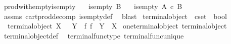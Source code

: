 \begin{isabellebody}
\endisadelimproof
\isanewline
{}\isamarkupfalse%
\ prod{\isacharunderscore}{\kern0pt}with{\isacharunderscore}{\kern0pt}empty{\isacharunderscore}{\kern0pt}is{\isacharunderscore}{\kern0pt}empty{}{\isacharcolon}{\kern0pt}\isanewline
\ \ \ {\isachardoublequoteopen}is{\isacharunderscore}{\kern0pt}empty\ {\isacharparenleft}{\kern0pt}B{\isacharparenright}{\kern0pt}{\isachardoublequoteclose}\isanewline
\ \ \ {\isachardoublequoteopen}is{\isacharunderscore}{\kern0pt}empty\ {\isacharparenleft}{\kern0pt}A\ {\isasymtimes}\isactrlsub c\ B{\isacharparenright}{\kern0pt}{\isachardoublequoteclose}\isanewline
%
\isadelimproof
\ \ %
\endisadelimproof
%
\isatagproof
{}\isamarkupfalse%
\ assms\ cart{\isacharunderscore}{\kern0pt}prod{\isacharunderscore}{\kern0pt}decomp\ is{\isacharunderscore}{\kern0pt}empty{\isacharunderscore}{\kern0pt}def\ \isamarkupfalse%
\ blast%
\endisatagproof
{\isafoldproof}%
%
\isadelimproof
%
\endisadelimproof
%
\isadelimdocument
%
\endisadelimdocument
%
\isatagdocument
%
\isamarkuptrue%
%
\endisatagdocument
{\isafolddocument}%
%
\isadelimdocument
%
\endisadelimdocument
{}\isamarkupfalse%
\ terminal{\isacharunderscore}{\kern0pt}object\ {\isacharcolon}{\kern0pt}{\isacharcolon}{\kern0pt}\ {\isachardoublequoteopen}cset\ {\isasymRightarrow}\ bool{\isachardoublequoteclose}\ \isanewline
\ \ {\isachardoublequoteopen}terminal{\isacharunderscore}{\kern0pt}object\ X\ {\isasymlongleftrightarrow}\ {\isacharparenleft}{\kern0pt}{\isasymforall}\ Y{\isachardot}{\kern0pt}\ {\isasymexists}{\isacharbang}{\kern0pt}\ f{\isachardot}{\kern0pt}\ f\ {\isacharcolon}{\kern0pt}\ Y\ {\isasymrightarrow}\ X{\isacharparenright}{\kern0pt}{\isachardoublequoteclose}\isanewline
\isanewline
{}\isamarkupfalse%
\ one{\isacharunderscore}{\kern0pt}terminal{\isacharunderscore}{\kern0pt}object{\isacharcolon}{\kern0pt}\ {\isachardoublequoteopen}terminal{\isacharunderscore}{\kern0pt}object{\isacharparenleft}{\kern0pt}{\isasymone}{\isacharparenright}{\kern0pt}{\isachardoublequoteclose}\isanewline
%
\isadelimproof
\ \ %
\endisadelimproof
%
\isatagproof
{}\isamarkupfalse%
\ terminal{\isacharunderscore}{\kern0pt}object{\isacharunderscore}{\kern0pt}def\ \isamarkupfalse%
\ terminal{\isacharunderscore}{\kern0pt}func{\isacharunderscore}{\kern0pt}type\ terminal{\isacharunderscore}{\kern0pt}func{\isacharunderscore}{\kern0pt}unique\ \isamarkupfalse%

\end{isabellebody}
